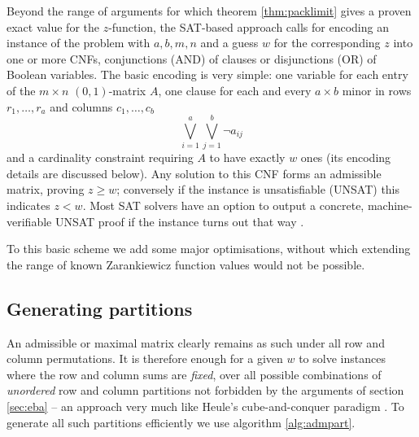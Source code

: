 \documentclass[10pt,a4paper]{article}
\theoremstyle{definition}
\begin{document}
	Beyond the range of arguments for which theorem \ref{thm:packlimit} gives a proven exact value for the $z$-function, the SAT-based approach calls for encoding an instance of the problem with $a,b,m,n$ and a guess $w$ for the corresponding $z$ into one or more CNFs, conjunctions (AND) of clauses or disjunctions (OR) of Boolean variables. The basic encoding is very simple: one variable for each entry of the $m\times n$ $(0,1)$-matrix $A$, one clause for each and every $a\times b$ minor in rows $r_1,\dots,r_a$ and columns $c_1,\dots,c_b$
	\begin{equation*}
		\bigvee_{i=1}^a\bigvee_{j=1}^b\neg a_{ij}
	\end{equation*}
	and a cardinality constraint requiring $A$ to have exactly $w$ ones (its encoding details are discussed below). Any solution to this CNF forms an admissible matrix, proving $z\ge w$; conversely if the instance is unsatisfiable (UNSAT) this indicates $z<w$. Most SAT solvers have an option to output a concrete, machine-verifiable UNSAT proof if the instance turns out that way \cite{drattrim}.
	
	To this basic scheme we add some major optimisations, without which extending the range of known Zarankiewicz function values would not be possible.
	
	\subsection{Generating partitions}
	
	An admissible or maximal matrix clearly remains as such under all row and column permutations. It is therefore enough for a given $w$ to solve instances where the row and column sums are \textit{fixed}, over all possible combinations of \textit{unordered} row and column partitions not forbidden by the arguments of section \ref{sec:eba} -- an approach very much like Heule's cube-and-conquer paradigm \cite{cubeandconquer}. To generate all such partitions efficiently we use algorithm \ref{alg:admpart}.
	
\end{document}
